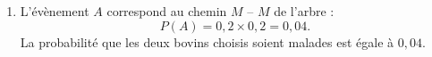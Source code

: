 \documentclass[10pt]{article}
\begin{document}
\begin{enumerate}
\begin{enumerate}
\begin{center}
		\end{center}

		\item L'évènement $A$ correspond au chemin $M$ -- $M$ de l'arbre :
		\[P(A) = 0,2 \times 0,2 = 0,04.\]
		La probabilité que les deux bovins choisis soient malades est égale à $0,04$.
	\end{enumerate}
\end{enumerate}
\end{document}
